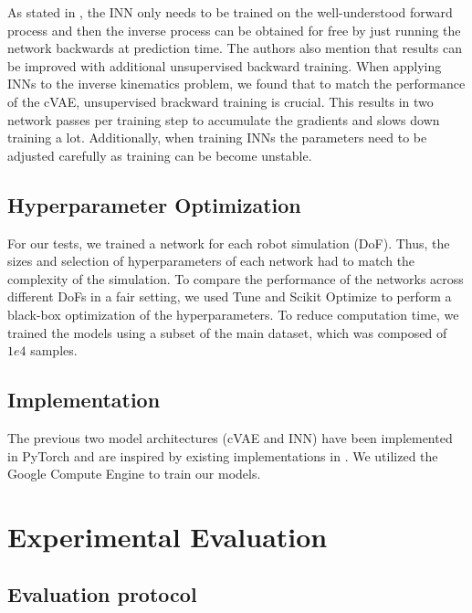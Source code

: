 \documentclass[conference]{IEEEtran}
\begin{document}
As stated in \cite{Ardizzone2018}, the INN only needs to be trained on the well-understood forward process and then the inverse process can be obtained for free by just running the network backwards at prediction time. The authors also mention that results can be improved with additional unsupervised backward training. When applying INNs to the inverse kinematics problem, we found that to match the performance of the cVAE, unsupervised brackward training is crucial. This results in two network passes per training step to accumulate the gradients and slows down training a lot. Additionally, when training INNs the parameters need to be adjusted carefully as training can be become unstable.

\subsection*{Hyperparameter Optimization}

For our tests, we trained a network for each robot simulation (DoF). Thus, the sizes and selection of hyperparameters of each network had to match the complexity of the simulation. To compare the performance of the networks across different DoFs in a fair setting, we used Tune \cite{liaw2018tune} and Scikit Optimize \cite{scikit-optimize} to perform a black-box optimization of the hyperparameters. To reduce computation time, we trained the models using a subset of the main dataset, which was composed of \( 1e4 \) samples.


\subsection*{Implementation}

The previous two model architectures (cVAE and INN) have been implemented in PyTorch and are inspired by existing implementations in  \cite{graviraja2019, freia2020}. We utilized the Google Compute Engine to train our models.

\section*{Experimental Evaluation}

\subsection*{Evaluation protocol}
\end{document}
